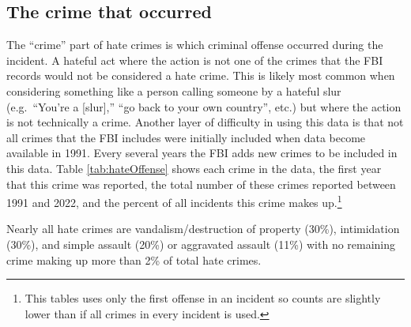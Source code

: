 \documentclass[
  12pt,
  openany]{book}
\begin{document}
\subsection{The crime that occurred}\label{the-crime-that-occurred}

The ``crime'' part of hate crimes is which criminal offense occurred during the incident. A hateful act where the action is not one of the crimes that the FBI records would not be considered a hate crime. This is likely most common when considering something like a person calling someone by a hateful slur (e.g.~``You're a {[}slur{]},'' ``go back to your own country'', etc.) but where the action is not technically a crime. Another layer of difficulty in using this data is that not all crimes that the FBI includes were initially included when data become available in 1991. Every several years the FBI adds new crimes to be included in this data. Table \ref{tab:hateOffense} shows each crime in the data, the first year that this crime was reported, the total number of these crimes reported between 1991 and 2022, and the percent of all incidents this crime makes up.\footnote{This tables uses only the first offense in an incident so counts are slightly lower than if all crimes in every incident is used.}

Nearly all hate crimes are vandalism/destruction of property (30\%), intimidation (30\%), and simple assault (20\%) or aggravated assault (11\%) with no remaining crime making up more than 2\% of total hate crimes.
\end{document}
